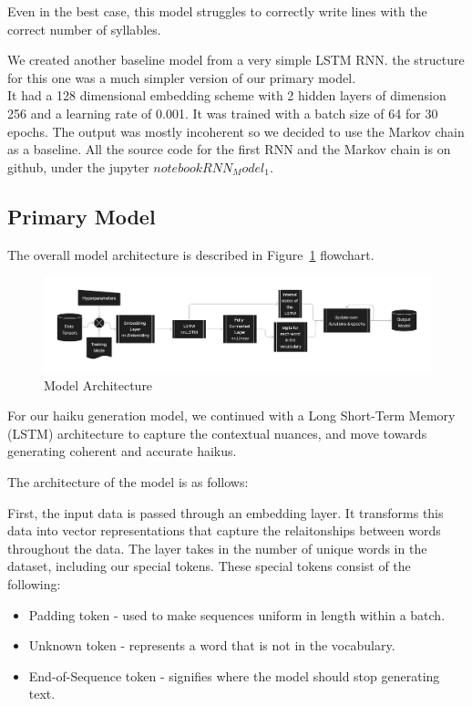 \documentclass{article} %
\begin{document}
Even in the best case, this model struggles to correctly write lines with the correct number of syllables.

We created another baseline model from a very simple LSTM RNN. the structure for this one was a much simpler version of our primary model.\\

It had a 128 dimensional embedding scheme with 2 hidden layers of dimension 256 and a learning rate of 0.001. It was trained with a batch size of 64
for 30 epochs. The output was mostly incoherent so we decided to use the Markov chain as a baseline. All the source code for the first RNN and the 
Markov chain is on github, under the jupyter $notebook RNN_Model_1$.
 
 
 


\subsection{Primary Model}

The overall model architecture is described in Figure~\ref{fig:flowchart} flowchart.

\begin{figure}[h]
  \begin{center}
  \includegraphics[width=1\textwidth]{Figs/HaikuLSTMArch.png}
  \end{center}
  \caption{Model Architecture}
  \label{fig:flowchart}
\end{figure}

For our haiku generation model, we continued with a Long Short-Term Memory (LSTM) architecture to capture the contextual nuances, and move towards generating coherent and accurate haikus.

The architecture of the model is as follows:

First, the input data is passed through an embedding layer. 
It transforms this data into vector representations that capture the 
relaitonships between words throughout the data. 
The layer takes in the number of unique words in the dataset, 
including our special tokens. 
These special tokens consist of the following:
\begin{itemize}
  \item Padding token - used to make sequences uniform in length within a batch.
  \item Unknown token - represents a word that is not in the vocabulary.
  \item End-of-Sequence token - signifies where the model should stop generating text.
\end{itemize}
\end{document}
